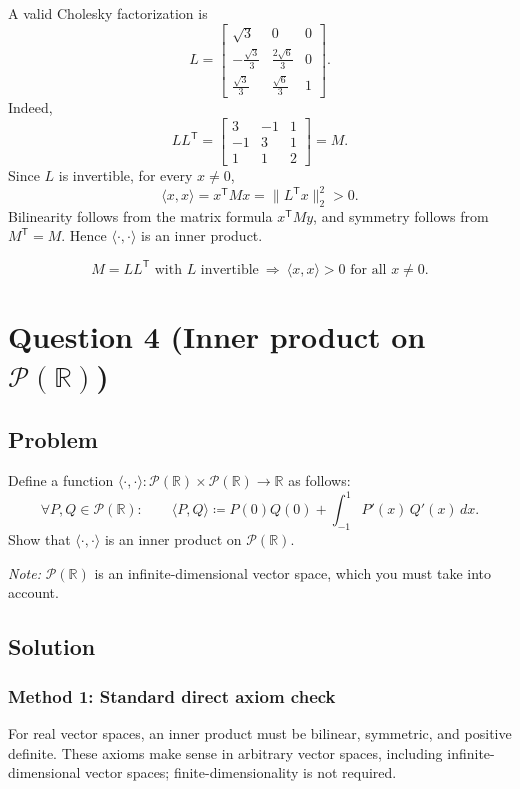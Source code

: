 \documentclass[12pt]{article}
\newcommand{\df}{\coloneqq}
\newcommand{\R}{\mathbb{R}}
\begin{document}
A valid Cholesky factorization is
\[
L=
\begin{bmatrix}
\sqrt{3} & 0 & 0\\
-\frac{\sqrt{3}}{3} & \frac{2\sqrt{6}}{3} & 0\\
\frac{\sqrt{3}}{3} & \frac{\sqrt{6}}{3} & 1
\end{bmatrix}.
\]
Indeed,
\[
LL^{\mathsf T}
=
\begin{bmatrix}
3 & -1 & 1\\
-1 & 3 & 1\\
1 & 1 & 2
\end{bmatrix}=M.
\]
Since $L$ is invertible, for every $x\neq 0$,
\[
\langle x,x\rangle=x^{\mathsf T}Mx=\|L^{\mathsf T}x\|_2^2>0.
\]
Bilinearity follows from the matrix formula $x^{\mathsf T}My$, and symmetry follows from $M^{\mathsf T}=M$. Hence $\langle\cdot,\cdot\rangle$ is an inner product.

\[
\boxed{\,M=LL^{\mathsf T}\text{ with }L\text{ invertible}\ \Rightarrow\ \langle x,x\rangle>0\text{ for all }x\neq 0.\,}
\]

\newpage
\section{Question 4 (Inner product on $\mathcal{P}(\R)$)}
\subsection{Problem}
Define a function $\langle\cdot,\cdot\rangle : \mathcal{P}(\R)\times \mathcal{P}(\R)\to \R$ as follows:
\[
\forall P,Q\in \mathcal{P}(\R):\qquad
\langle P,Q\rangle \df P(0)Q(0)+\int_{-1}^{1} P'(x)\,Q'(x)\,dx.
\]
Show that $\langle\cdot,\cdot\rangle$ is an inner product on $\mathcal{P}(\R)$.

\smallskip
\noindent\textit{Note:} $\mathcal{P}(\R)$ is an infinite-dimensional vector space, which you must take into account.


\vspace{2cm}
\subsection{Solution}

\subsubsection{Method 1: Standard direct axiom check}
For real vector spaces, an inner product must be bilinear, symmetric, and positive definite. These axioms make sense in arbitrary vector spaces, including infinite-dimensional vector spaces; finite-dimensionality is not required.
\end{document}
